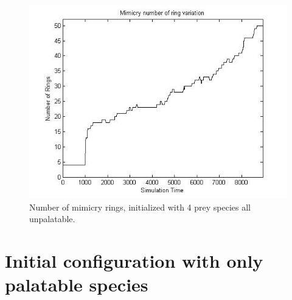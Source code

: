 \begin{figure}[H]
	\centering
	\includegraphics[scale=0.50]{images/ringSize9k-4Prey-unp}
	\caption{Number of mimicry rings, initialized with 4 prey species all unpalatable.}
	\label{fig:ringSize10k-4-Prey-unp}
\end{figure}

\section{Initial configuration with only palatable species}
\label{sec:init-only-palatable-species}

